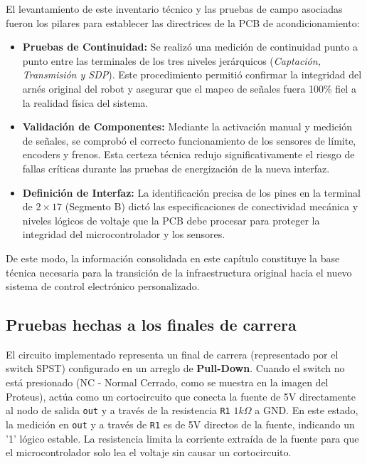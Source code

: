 	El levantamiento de este inventario técnico y las pruebas de campo asociadas fueron los pilares para establecer las directrices de la PCB de acondicionamiento:
	
	\begin{itemize}
		\item \textbf{Pruebas de Continuidad:} Se realizó una medición de continuidad punto a punto entre las terminales de los tres niveles jerárquicos (\textit{Captación, Transmisión y SDP}). Este procedimiento permitió confirmar la integridad del arnés original del robot y asegurar que el mapeo de señales fuera 100\% fiel a la realidad física del sistema.
		\item \textbf{Validación de Componentes:} Mediante la activación manual y medición de señales, se comprobó el correcto funcionamiento de los sensores de límite, encoders y frenos. Esta certeza técnica redujo significativamente el riesgo de fallas críticas durante las pruebas de energización de la nueva interfaz.
		\item \textbf{Definición de Interfaz:} La identificación precisa de los pines en la terminal de $2 \times 17$ (Segmento B) dictó las especificaciones de conectividad mecánica y niveles lógicos de voltaje que la PCB debe procesar para proteger la integridad del microcontrolador y los sensores.
	\end{itemize}
	
	De este modo, la información consolidada en este capítulo constituye la base técnica necesaria para la transición de la infraestructura original hacia el nuevo sistema de control electrónico personalizado.
	
	\subsection{Pruebas hechas a los finales de carrera}
	El circuito implementado representa un final de carrera (representado por el switch SPST) configurado en un arreglo de \textbf{Pull-Down}. Cuando el switch no está presionado (NC - Normal Cerrado, como se muestra en la imagen del Proteus), actúa como un cortocircuito que conecta la fuente de 5V directamente al nodo de salida \verb|out| y a través de la resistencia \verb|R1| $1k \Omega$ a GND. En este estado, la medición en \verb|out| y a través de \verb|R1| es de 5V directos de la fuente, indicando un '1' lógico estable. La resistencia limita la corriente extraída de la fuente para que el microcontrolador solo lea el voltaje sin causar un cortocircuito.
	
